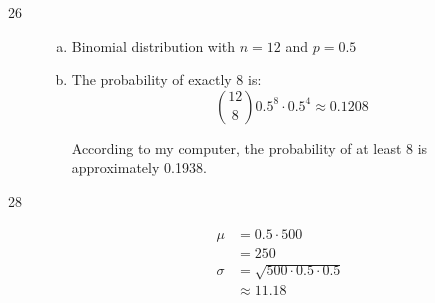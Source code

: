 \documentclass[letterpaper, landscape]{exam}
\begin{document}
\begin{description}
      \item[26]
        \begin{enumerate}[(a)]
          \item 
            Binomial distribution with $n = 12$ and $p = 0.5$

          \item The probability of exactly 8 is:
            \[
              \binom{12}{8} 0.5^8 \cdot 0.5^4 \approx \boxed{ 0.1208 } 
            \]

            According to my computer, the probability of at least 8 is
            approximately 0.1938.

        \end{enumerate}




      \item[28]
        \begin{align*}
          \mu     & = 0.5 \cdot 500 \\
                  & = 250 \\
          \sigma  & = \sqrt{500 \cdot 0.5 \cdot 0.5} \\
                  & \approx 11.18 \\
        \end{align*}


\end{description}
\end{document}
